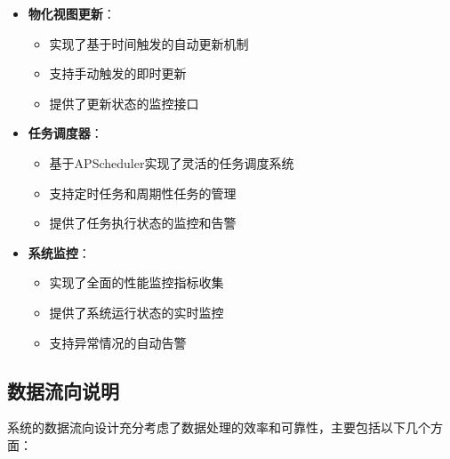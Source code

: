 \begin{itemize}
    \item \textbf{物化视图更新}：
    \begin{itemize}
        \item 实现了基于时间触发的自动更新机制
        \item 支持手动触发的即时更新
        \item 提供了更新状态的监控接口
    \end{itemize}
    
    \item \textbf{任务调度器}：
    \begin{itemize}
        \item 基于APScheduler实现了灵活的任务调度系统
        \item 支持定时任务和周期性任务的管理
        \item 提供了任务执行状态的监控和告警
    \end{itemize}
    
    \item \textbf{系统监控}：
    \begin{itemize}
        \item 实现了全面的性能监控指标收集
        \item 提供了系统运行状态的实时监控
        \item 支持异常情况的自动告警
    \end{itemize}
\end{itemize}

\subsection{数据流向说明}
系统的数据流向设计充分考虑了数据处理的效率和可靠性，主要包括以下几个方面：

